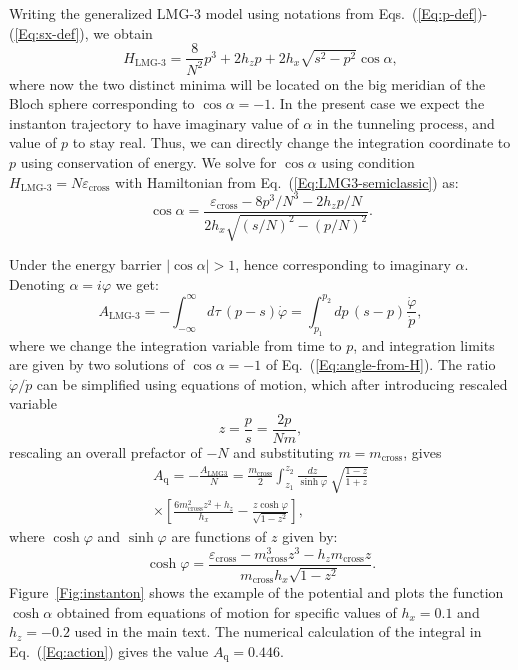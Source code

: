 \documentclass[aps,prx,showpacs,amsmath,amssymb,superscriptaddress,twocolumn,longbibliography,10pt,nofootinbib]{revtex4-2}
\renewcommand{\phi}{\alpha} %
\begin{document}
Writing the generalized LMG-3 model using notations from Eqs.~(\ref{Eq:p-def})-(\ref{Eq:sx-def}), we obtain
\begin{equation}\label{Eq:LMG3-semiclassic}
    H_\text{LMG-3}
    =
     \frac{8}{N^2} p^3 +  2 h_z p + 2 h_x \sqrt{s^2-p^2}\cos\phi,
\end{equation}
where now the two distinct minima will be located on the big meridian of the Bloch sphere corresponding to $\cos \phi = -1$. In the present case we expect the instanton trajectory to have imaginary value of $\phi$ in the tunneling process, and value of $p$ to stay real. Thus, we can directly change the integration coordinate to $p$ using conservation of energy. We solve for $\cos \alpha$ using condition $H_\text{LMG-3} = N \varepsilon_\text{cross}$ with Hamiltonian from Eq.~(\ref{Eq:LMG3-semiclassic}) as:
\begin{equation} \label{Eq:angle-from-H}
    \cos \phi = \frac{ \varepsilon_\text{cross}-8 p^3/N^3-2h_z p/N}{2h_x \sqrt{(s/N)^2-(p/N)^2}}.
\end{equation}

Under the energy barrier $|\cos \phi|>1$, hence corresponding to imaginary $\phi$. Denoting $\alpha = i \varphi$ we get:
\begin{equation}
A_\text{LMG-3} = -\int_{-\infty}^\infty d\tau\, (p-s) \dot\varphi = 
 \int_{p_1}^{p_2} dp \, (s-p) \frac{\dot\varphi}{\dot p},
\end{equation}
where we change the integration variable from time to $p$, and integration limits are given by two solutions of $\cos\phi=-1$ of Eq.~(\ref{Eq:angle-from-H}). The ratio $\dot\varphi/\dot p$ can be simplified using equations of motion, which after introducing rescaled variable 
\begin{equation}\label{Eq:z-def}
    z=\frac{p}{s} = \frac{2p}{Nm},
\end{equation}
rescaling an overall prefactor of $-N$ and substituting $m=m_\text{cross}$, gives 
\begin{multline}
    \label{Eq:action}
A_\text{q} = - \frac{A_\text{LMG3}}{N}=  \frac{m_\text{cross}}{2} \int_{z_1}^{z_2} \frac{dz}{ \sinh \varphi} \, \sqrt{\frac{1-z}{1+z}}\\
\times \left[ \frac{6m_\text{cross}^2z^2+h_z}{h_x} - \frac{z \cosh\varphi}{\sqrt{1-z^2}}\right],
\end{multline}
where $\cosh\varphi$ and $\sinh \varphi$ are functions of  $z$ given by:
\begin{equation}\label{Eq:cosh}
    \cosh \varphi = \frac{\varepsilon_\text{cross}-m_\text{cross}^3z^3-h_z  m_\text{cross} z}{m_\text{cross} h_x\sqrt{1-z^2}}.
\end{equation}
Figure~\ref{Fig:instanton} shows the example of the potential and plots the function $\cosh \alpha$ obtained from equations of motion for specific values of $h_x=0.1$ and $h_z=-0.2$ used in the main text. The numerical calculation of the integral in Eq.~(\ref{Eq:action}) gives the value  $A_\text{q} = 0.446$.
\end{document}
